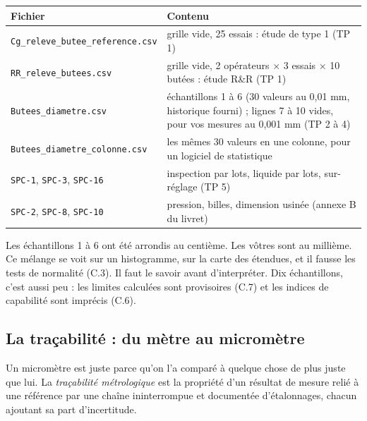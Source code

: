 \documentclass[11pt,a4paper]{article}
\newcommand{\xl}[1]{\texttt{\small #1}}
\begin{document}
\begin{center}\small
\begin{tabularx}{\textwidth}{@{}lX@{}}
\toprule
\textbf{Fichier} & \textbf{Contenu}\\\midrule
\xl{Cg\_releve\_butee\_reference.csv} & grille vide, 25 essais : étude de type 1 (TP 1)\\
\xl{RR\_releve\_butees.csv} & grille vide, 2 opérateurs $\times$ 3 essais $\times$ 10 butées : étude R\&R (TP 1)\\
\xl{Butees\_diametre.csv} & échantillons 1 à 6 (30 valeurs au 0,01 mm, historique fourni) ; lignes 7 à 10 vides, pour vos mesures au 0,001 mm (TP 2 à 4)\\
\xl{Butees\_diametre\_colonne.csv} & les mêmes 30 valeurs en une colonne, pour un logiciel de statistique\\
\xl{SPC-1}, \xl{SPC-3}, \xl{SPC-16} & inspection par lots, liquide par lots, sur-réglage (TP 5)\\
\xl{SPC-2}, \xl{SPC-8}, \xl{SPC-10} & pression, billes, dimension usinée (annexe B du livret)\\\bottomrule
\end{tabularx}
\end{center}

\begin{attention}
Les échantillons 1 à 6 ont été arrondis au centième. Les vôtres sont au millième. Ce mélange se voit sur un histogramme, sur la carte des étendues, et il fausse les tests de normalité (C.3). Il faut le savoir avant d'interpréter. Dix échantillons, c'est aussi peu : les limites calculées sont provisoires (C.7) et les indices de capabilité sont imprécis (C.6).
\end{attention}

\subsection{La traçabilité : du mètre au micromètre}\label{sec:traca}
Un micromètre est juste parce qu'on l'a comparé à quelque chose de plus juste que lui. La \emph{traçabilité métrologique} est la propriété d'un résultat de mesure relié à une référence par une chaîne ininterrompue et documentée d'étalonnages, chacun ajoutant sa part d'incertitude.
\end{document}
